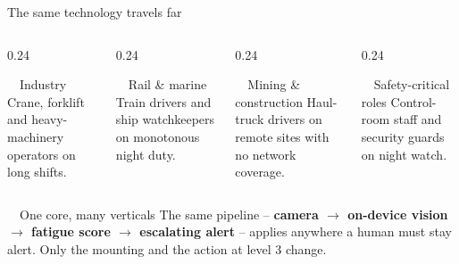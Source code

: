 \documentclass[aspectratio=169, 10pt]{beamer}
\begin{document}
\begin{frame}{The same technology travels far}
  \vspace{0.5em}
  \begin{columns}[T]
    \begin{column}{0.24\textwidth}
      \begin{card}{\faIndustry~~Industry}
        \scriptsize Crane, forklift and heavy-machinery operators on long shifts.
      \end{card}
    \end{column}
    \begin{column}{0.24\textwidth}
      \begin{card}{\faTrain~~Rail \& marine}
        \scriptsize Train drivers and ship watchkeepers on monotonous night duty.
      \end{card}
    \end{column}
    \begin{column}{0.24\textwidth}
      \begin{card}{\faHardHat~~Mining \& construction}
        \scriptsize Haul-truck drivers on remote sites with no network coverage.
      \end{card}
    \end{column}
    \begin{column}{0.24\textwidth}
      \begin{card}{\faUserShield~~Safety-critical roles}
        \scriptsize Control-room staff and security guards on night watch.
      \end{card}
    \end{column}
  \end{columns}
  \vspace{1.0em}
  \begin{center}
    \begin{goldcard}[width=0.92\textwidth]{\faRecycle~~One core, many verticals}
      \small The same pipeline -- \textbf{camera $\to$ on-device vision $\to$ fatigue score $\to$ escalating alert} -- applies anywhere a human must stay alert. Only the mounting and the action at level 3 change.
    \end{goldcard}
  \end{center}
\end{frame}
\end{document}
